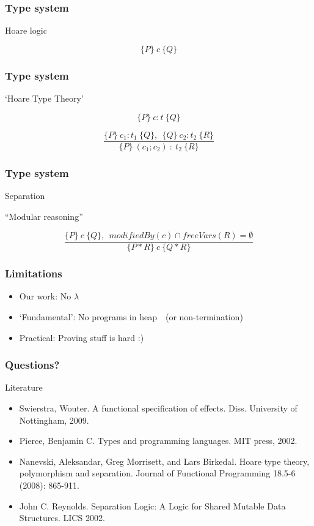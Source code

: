 \documentclass{beamer}
\begin{document}
\begin{frame}\frametitle{Type system}

Hoare logic

\[ 
   \{ P \}\ c\ \{ Q \}
\]

\end{frame}


\begin{frame}\frametitle{Type system}

`Hoare Type Theory'

\[ 
   \{ P \}\ c:t\ \{ Q \}
\]

\[
\frac{\{ P \}\ c_1:t_1\ \{ Q \},\ \ \{ Q \}\ c_2:t_2\ \{ R \}  }
     {\{ P \}\ (c_1;c_2)\ :\ t_2\ \{ R \}  }
\]
\end{frame}

\begin{frame}\frametitle{Type system}

Separation

``Modular reasoning''

\[
\frac{\{ P \}\ c\ \{ Q \},\ \ modifiedBy(c) \cap freeVars(R) = \emptyset  }
     {\{ P * R \}\ c\ \{ Q * R \}  }
\]
\end{frame}

\begin{frame}\frametitle{Limitations}

\begin{itemize}
 \item Our work: No $\lambda$
 \item `Fundamental': No programs in heap\ \ (or non-termination)
 \item Practical: Proving stuff is hard :)
\end{itemize}

\end{frame}

\begin{frame}\frametitle{Questions?}

Literature
\begin{itemize}
\item Swierstra, Wouter. A functional specification of effects. Diss. University of Nottingham, 2009.
\item Pierce, Benjamin C. Types and programming languages. MIT press, 2002.
\item Nanevski, Aleksandar, Greg Morrisett, and Lars Birkedal. Hoare type theory, polymorphism and separation. Journal of Functional Programming 18.5-6 (2008): 865-911.
\item John C. Reynolds. Separation Logic: A Logic for Shared Mutable Data Structures. LICS 2002.
\end{itemize}

\end{frame}
\end{document}
